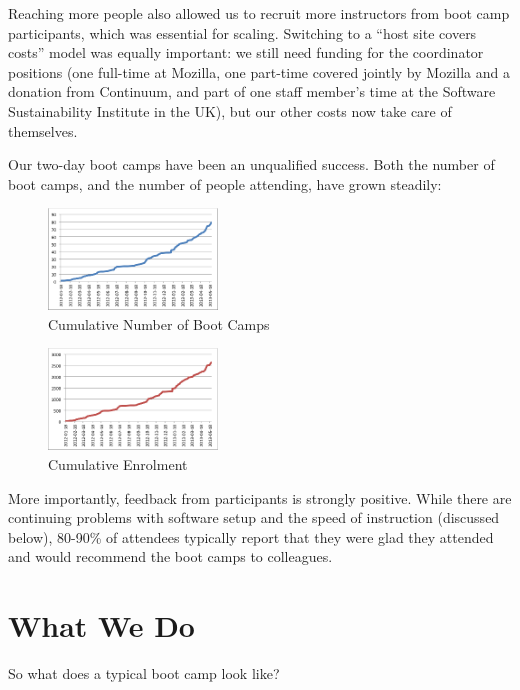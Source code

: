 \documentclass[10pt,a4paper,twocolumn]{article}
\begin{document}
Reaching more people also allowed us to recruit more instructors from
boot camp participants, which was essential for scaling. Switching to a
``host site covers costs'' model was equally important: we still need
funding for the coordinator positions (one full-time at Mozilla, one
part-time covered jointly by Mozilla and a donation from Continuum, and
part of one staff member's time at the Software Sustainability Institute
in the UK), but our other costs now take care of themselves.

Our two-day boot camps have been an unqualified success. Both the number
of boot camps, and the number of people attending, have grown steadily:

\begin{figure}
\centering
\includegraphics[width=0.4\textwidth]{bootcamps.png}
\caption{\label{f:bootcamps}Cumulative Number of Boot Camps}
\end{figure}

\begin{figure}
\centering
\includegraphics[width=0.4\textwidth]{enrolment.png}
\caption{\label{f:enrolment}Cumulative Enrolment}
\end{figure}

More importantly, feedback from participants is strongly positive. While
there are continuing problems with software setup and the speed of
instruction (discussed below), 80-90\% of attendees typically report
that they were glad they attended and would recommend the boot camps to
colleagues.

\section*{What We Do}

So what does a typical boot camp look like?
\end{document}
